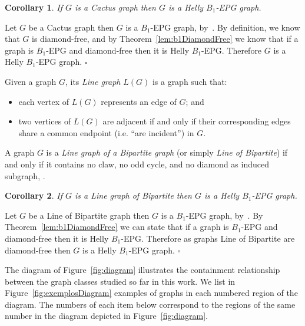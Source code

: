 \documentclass[9pt]{entcs}
\newtheorem{coro}{Corollary}[section]
\begin{document}
 
\begin{coro}
If $G$ is a Cactus graph then $G$ is a Helly $B_1$-EPG graph.
\end{coro}
\begin{pf}
Let $G$ be a Cactus graph then $G$ is a $B_1$-EPG graph, by~\cite{cela2019monotonic}. By definition, we know that $G$ is diamond-free, and by Theorem~\ref{lem:b1DiamondFree} we know that if a graph is $B_1$-EPG and diamond-free then it is  Helly $B_1$-EPG. Therefore $G$ is a Helly $B_1$-EPG graph.
$\square$\end{pf}

Given a graph $G$, its \textit{Line graph} $L(G)$ is a graph such that:
\begin{itemize}
    \item each vertex of $L(G)$ represents an edge of $G$; and
    \item two vertices of $L(G)$ are adjacent if and only if their corresponding edges share a common endpoint (i.e. ``are incident'') in $G$. 
\end{itemize}




A graph $G$ is a \textit{Line graph of a Bipartite graph} (or simply \textit{Line of Bipartite}) if and only if it
contains no claw, no odd cycle, and no diamond as induced subgraph, \cite{harary1974line}.



\begin{coro}\label{coro:lineOfBipartite}
If $G$ is a Line graph of Bipartite then $G$ is a Helly $B_1$-EPG graph. 
\end{coro}

\begin{pf}
Let $G$ be a Line of Bipartite graph then $G$ is a $B_1$-EPG graph, by~\cite{golumbic2018edge}. By Theorem~\ref{lem:b1DiamondFree} we can state that if  a graph is $B_1$-EPG and diamond-free then it is  Helly $B_1$-EPG. Therefore as graphs Line of Bipartite are diamond-free then $G$ is a Helly $B_1$-EPG graph. 
$\square$
\end{pf}

The diagram of Figure~\ref{fig:diagram}
illustrates the containment relationship between the graph classes  studied so far in this work. 
We list in Figure~\ref{fig:exemplosDiagram} examples of graphs in each numbered region of the diagram. The numbers of each item below correspond to the regions of the same number in the diagram depicted in Figure~\ref{fig:diagram}.

\end{document}
